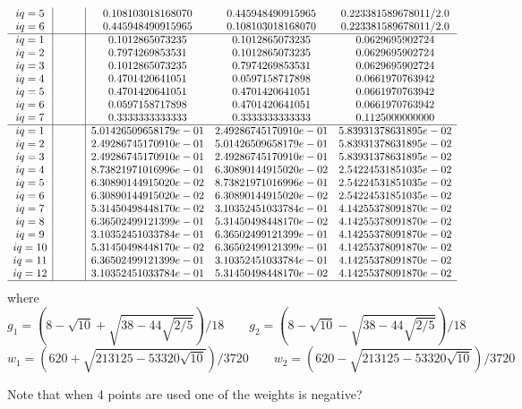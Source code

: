 {\[\begin{array}{c|ccc|ccc}
iq=5&&&&0.108103018168070 &  0.445948490915965    &    0.223381589678011/2.0 \\
iq=6&&&&0.445948490915965 &  0.108103018168070    &    0.223381589678011/2.0 \\
\hline
iq=1 &&&&0.1012865073235 &  0.1012865073235  &     0.0629695902724 \\
iq=2 &&&&0.7974269853531 &  0.1012865073235  &     0.0629695902724 \\
iq=3 &&&&0.1012865073235 &  0.7974269853531  &     0.0629695902724 \\
iq=4 &&&&0.4701420641051 &  0.0597158717898  &     0.0661970763942 \\
iq=5 &&&&0.4701420641051 &  0.4701420641051  &     0.0661970763942 \\
iq=6 &&&&0.0597158717898 &  0.4701420641051  &     0.0661970763942 \\
iq=7 &&&&0.3333333333333 &  0.3333333333333  &     0.1125000000000 \\
\hline
iq=1&&&& 5.01426509658179e-01&  2.49286745170910e-01 &   5.83931378631895e-02 \\ 
iq=2&&&& 2.49286745170910e-01&  5.01426509658179e-01 &   5.83931378631895e-02 \\ 
iq=3&&&& 2.49286745170910e-01&  2.49286745170910e-01 &   5.83931378631895e-02 \\ 
iq=4&&&& 8.73821971016996e-01&  6.30890144915020e-02 &   2.54224531851035e-02 \\ 
iq=5&&&& 6.30890144915020e-02&  8.73821971016996e-01 &   2.54224531851035e-02 \\ 
iq=6&&&& 6.30890144915020e-02&  6.30890144915020e-02 &   2.54224531851035e-02 \\ 
iq=7&&&& 5.31450498448170e-02&  3.10352451033784e-01 &   4.14255378091870e-02 \\ 
iq=8&&&& 6.36502499121399e-01&  5.31450498448170e-02 &   4.14255378091870e-02 \\ 
iq=9&&&& 3.10352451033784e-01&  6.36502499121399e-01 &   4.14255378091870e-02 \\ 
iq=10&&&& 5.31450498448170e-02&  6.36502499121399e-01 &   4.14255378091870e-02 \\ 
iq=11&&&& 6.36502499121399e-01&  3.10352451033784e-01 &   4.14255378091870e-02 \\ 
iq=12&&&& 3.10352451033784e-01&  5.31450498448170e-02 &   4.14255378091870e-02 \\ 
\hline
\end{array}
\]
}
where
\[ 
g_1 = \left(8-\sqrt{10} + \sqrt{38-44\sqrt{2/5}}\right)/18
\qquad
g_2 = \left(8-\sqrt{10} - \sqrt{38-44\sqrt{2/5}}\right)/18
\]
\[
w_1 = \left(620+\sqrt{213125-53320\sqrt{10}}\right)/3720
\qquad
w_2 = \left(620-\sqrt{213125-53320\sqrt{10}}\right)/3720
\]

Note that when 4 points are used one of the weights is negative?






